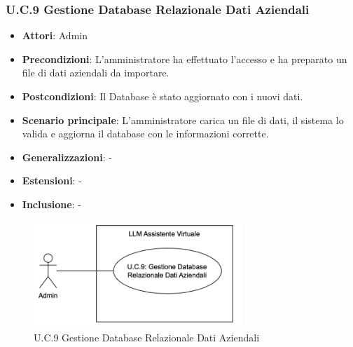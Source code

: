 \subsubsection{U.C.9 Gestione Database Relazionale Dati Aziendali}
\begin{itemize}
    \item \textbf{Attori}: Admin
    \item \textbf{Precondizioni}: L'amministratore ha effettuato l'accesso e ha preparato un file di dati aziendali da importare.
    \item \textbf{Postcondizioni}: Il Database è stato aggiornato con i nuovi dati.
    \item \textbf{Scenario principale}: L'amministratore carica un file di dati, il sistema lo valida e aggiorna il database con le informazioni corrette.
    \item \textbf{Generalizzazioni}: -
    \item \textbf{Estensioni}: -
    \item \textbf{Inclusione}: -
\end{itemize}
\begin{figure}[H]
    \centering
    \includegraphics[width=0.7\textwidth]{img/UC9.png}
    \caption{U.C.9 Gestione Database Relazionale Dati Aziendali}
\end{figure}
\newpage


